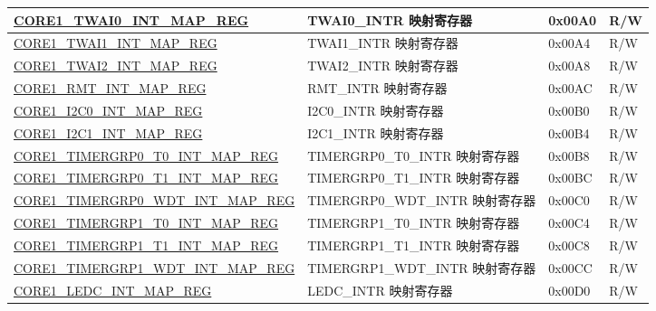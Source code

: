 \begin{longtable}{ | p{8.7cm} | p{6.2cm} | p{1.3cm} | p{1cm} | }
\hyperref[regdesc:CORE1TWAI0INTMAPREG]{CORE1\_TWAI0\_INT\_MAP\_REG} & TWAI0\_INTR 映射寄存器 & 0x00A0 & R/W \\ \hline

\hyperref[regdesc:CORE1TWAI1INTMAPREG]{CORE1\_TWAI1\_INT\_MAP\_REG} & TWAI1\_INTR 映射寄存器 & 0x00A4 & R/W \\ \hline

\hyperref[regdesc:CORE1TWAI2INTMAPREG]{CORE1\_TWAI2\_INT\_MAP\_REG} & TWAI2\_INTR 映射寄存器 & 0x00A8 & R/W \\ \hline

\hyperref[regdesc:CORE1RMTINTMAPREG]{CORE1\_RMT\_INT\_MAP\_REG} & RMT\_INTR 映射寄存器 & 0x00AC & R/W \\ \hline

\hyperref[regdesc:CORE1I2C0INTMAPREG]{CORE1\_I2C0\_INT\_MAP\_REG} & I2C0\_INTR 映射寄存器 & 0x00B0 & R/W \\ \hline

\hyperref[regdesc:CORE1I2C1INTMAPREG]{CORE1\_I2C1\_INT\_MAP\_REG} & I2C1\_INTR 映射寄存器 & 0x00B4 & R/W \\ \hline

\hyperref[regdesc:CORE1TIMERGRP0T0INTMAPREG]{CORE1\_TIMERGRP0\_T0\_INT\_MAP\_REG} & TIMERGRP0\_T0\_INTR 映射寄存器 & 0x00B8 & R/W \\ \hline

\hyperref[regdesc:CORE1TIMERGRP0T1INTMAPREG]{CORE1\_TIMERGRP0\_T1\_INT\_MAP\_REG} & TIMERGRP0\_T1\_INTR 映射寄存器 & 0x00BC & R/W \\ \hline

\hyperref[regdesc:CORE1TIMERGRP0WDTINTMAPREG]{CORE1\_TIMERGRP0\_WDT\_INT\_MAP\_REG} & TIMERGRP0\_WDT\_INTR 映射寄存器 & 0x00C0 & R/W \\ \hline

\hyperref[regdesc:CORE1TIMERGRP1T0INTMAPREG]{CORE1\_TIMERGRP1\_T0\_INT\_MAP\_REG} & TIMERGRP1\_T0\_INTR 映射寄存器 & 0x00C4 & R/W \\ \hline

\hyperref[regdesc:CORE1TIMERGRP1T1INTMAPREG]{CORE1\_TIMERGRP1\_T1\_INT\_MAP\_REG} & TIMERGRP1\_T1\_INTR 映射寄存器 & 0x00C8 & R/W \\ \hline

\hyperref[regdesc:CORE1TIMERGRP1WDTINTMAPREG]{CORE1\_TIMERGRP1\_WDT\_INT\_MAP\_REG} & TIMERGRP1\_WDT\_INTR 映射寄存器 & 0x00CC & R/W \\ \hline

\hyperref[regdesc:CORE1LEDCINTMAPREG]{CORE1\_LEDC\_INT\_MAP\_REG} & LEDC\_INTR 映射寄存器 & 0x00D0 & R/W \\ \hline


\end{longtable}
